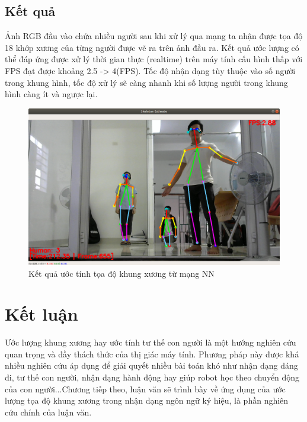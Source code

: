 \subsection{Kết quả}
Ảnh RGB đầu vào chứa nhiều người sau khi xử lý qua mạng ta nhận được tọa độ 18 khớp xương của từng người được vẽ ra trên ảnh đầu ra. Kết quả ước lượng có thể đáp ứng được xử lý thời gian thực (realtime) trên máy tính cấu hình thấp với FPS đạt được khoảng 2.5 -> 4(FPS). Tốc độ nhận dạng tùy thuộc vào số người trong khung hình, tốc độ xử lý sẽ càng nhanh khi số lượng người trong khung hình càng ít và ngược lại.

\FloatBarrier
\begin{figure}[htp]
\begin{center}
\includegraphics[scale=0.37]{chap3/c3_figs/skeleton_out.png}
\end{center}
\caption{Kết quả ước tính tọa độ khung xương từ mạng NN}
\label{fig:kq_skeleton}
\end{figure}
\FloatBarrier

\section{Kết luận}
Ước lượng khung xương hay ước tính tư thế con người là một hướng nghiên cứu quan trọng và đầy thách thức của thị giác máy tính. Phương pháp này được khá nhiều nghiên cứu áp dụng để giải quyết nhiều bài toán khó như nhận dạng dáng đi, tư thế con người, nhận dạng hành động hay giúp robot học theo chuyển động của con người...Chương tiếp theo, luận văn sẽ trình bày về ứng dụng của ước lượng tọa độ khung xương trong nhận dạng ngôn ngữ ký hiệu, là phần nghiên cứu chính của luận văn.